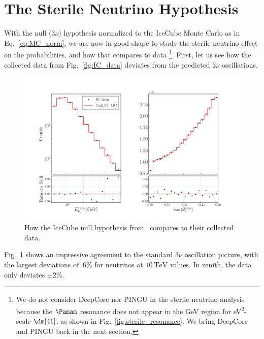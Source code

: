 \section{The Sterile Neutrino Hypothesis}\label{sec:sterileResults}
With the null ($3\nu$) hypothesis normalized to the IceCube Monte Carlo as in Eq.~\ref{eq:MC_norm}, we are now in good shape to study the sterile neutrino effect on the probabilities, and how that compares to data
\footnote{We do not consider DeepCore nor PINGU in the sterile neutrino analysis because the $\Pamam$ resonance does not appear in the \si{\GeV} region for \si{\eV^2}-scale $\dm[41]$, as shown in Fig.~\ref{fig:sterile_resonance}.
We bring DeepCore and PINGU back in the next section.}.
First, let us see how the collected data from Fig.~\ref{fig:IC_data} deviates from the predicted $3\nu$ oscillations.
\begin{figure}
    \centering
    \includegraphics[width=1\textwidth]{figures/IC_rates.pdf}
    \caption{How the IceCube null hypothesis from~\cite{IC2020} compares to their collected data.}\label{fig:IC_rates}
\end{figure}
Fig.~\ref{fig:IC_rates} shows an impressive agreement to the standard $3\nu$ oscillation picture, with the largest deviations of $~6\%$
for neutrinos at $\SI{10}{\TeV}$ values. In zenith, the data only deviates $\pm 2\%$.


